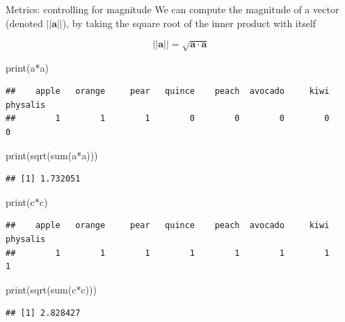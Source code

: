 \documentclass[
  10pt,
  ignorenonframetext,
  aspectratio=169]{beamer}
\newenvironment{Shaded}{\begin{snugshade}}{\end{snugshade}}
\newcommand{\FunctionTok}[1]{\textcolor[rgb]{0.94,0.94,0.56}{#1}}
\newcommand{\NormalTok}[1]{\textcolor[rgb]{0.80,0.80,0.80}{#1}}
\newcommand{\SpecialCharTok}[1]{\textcolor[rgb]{0.86,0.64,0.64}{#1}}
\begin{document}
\begin{frame}[fragile]{Metrics: controlling for magnitude}
\protect\hypertarget{metrics-controlling-for-magnitude}{}
We can compute the magnitude of a vector (denoted \(||\mathbf{a}||\)),
by taking the square root of the inner product with itself

\[||\mathbf{a}|| = \sqrt{\mathbf{a} \cdot \mathbf{a}} \]

\scriptsize

\begin{Shaded}
\begin{Highlighting}[]
\FunctionTok{print}\NormalTok{(a}\SpecialCharTok{*}\NormalTok{a)}
\end{Highlighting}
\end{Shaded}

\begin{verbatim}
##    apple   orange     pear   quince    peach  avocado     kiwi physalis 
##        1        1        1        0        0        0        0        0
\end{verbatim}

\begin{Shaded}
\begin{Highlighting}[]
\FunctionTok{print}\NormalTok{(}\FunctionTok{sqrt}\NormalTok{(}\FunctionTok{sum}\NormalTok{(a}\SpecialCharTok{*}\NormalTok{a)))}
\end{Highlighting}
\end{Shaded}

\begin{verbatim}
## [1] 1.732051
\end{verbatim}

\begin{Shaded}
\begin{Highlighting}[]
\FunctionTok{print}\NormalTok{(c}\SpecialCharTok{*}\NormalTok{c)}
\end{Highlighting}
\end{Shaded}

\begin{verbatim}
##    apple   orange     pear   quince    peach  avocado     kiwi physalis 
##        1        1        1        1        1        1        1        1
\end{verbatim}

\begin{Shaded}
\begin{Highlighting}[]
\FunctionTok{print}\NormalTok{(}\FunctionTok{sqrt}\NormalTok{(}\FunctionTok{sum}\NormalTok{(c}\SpecialCharTok{*}\NormalTok{c)))}
\end{Highlighting}
\end{Shaded}

\begin{verbatim}
## [1] 2.828427
\end{verbatim}
\end{frame}
\end{document}
